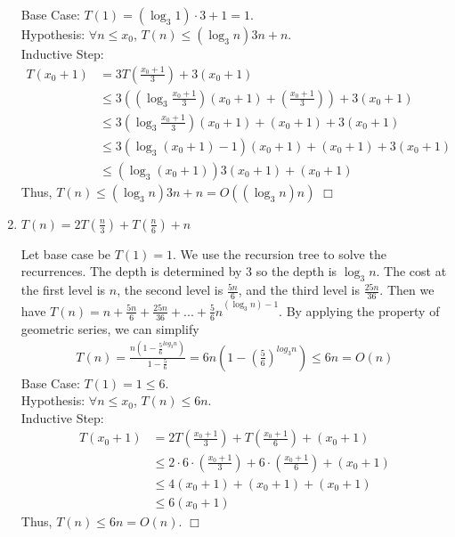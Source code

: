 \documentclass[10pt]{article}
\newenvironment{proof}{\par\noindent{\it Proof.}\hspace*{1em}}{$\Box$\bigskip}
\begin{document}
\begin{enumerate}
\begin{proof}
    Base Case: $T(1)= (\log_3 1)\cdot 3 + 1 = 1$.\\
    Hypothesis: $\forall n \leq x_0$, $T(n) \leq (\log_3 n)3n + n$.\\
    Inductive Step: 
    \begin{align}
        T(x_0+1)&=3T(\frac{x_0+1}{3})+3(x_0+1)\\
                &\leq 3((\log_3 {\frac{x_0+1}{3}})(x_0+1) + {(\frac{x_0+1}{3})})+3(x_0+1)\\
                &\leq 3(\log_3 {\frac{x_0+1}{3}})(x_0+1) + (x_0+1)+3(x_0+1)\\
                &\leq 3(\log_3 (x_0+1)-1)(x_0+1) +(x_0+1)+3(x_0+1)\\
                &\leq (\log_3 (x_0+1))3(x_0+1) + (x_0+1) 
    \end{align}
    Thus, $T(n) \leq (\log_3 n)3n+n = O((\log_3 n)n)$
    \end{proof}
    \item $T(n) = 2 T(\frac{n}{3}) + T(\frac{n}{6}) + n$
    \begin{proof}
    Let base case be $T(1)=1$. We use the recursion tree to solve the recurrences. The depth is determined by 3 so the depth is $\log_3 n$. The cost at the first level is $n$, the second level is $\frac{5n}{6}$, and the third level is $\frac{25n}{36}$. Then we have $T(n) = n + \frac{5n}{6} + \frac{25n}{36} + ... + {\frac{5}{6}n}^{(\log_3 n)-1}$. By applying the property of geometric series, we can simplify 
    \begin{align}
        T(n) = \frac{n(1-{\frac{5}{6}}^{log_3 n})}{1-\frac{5}{6}}=6n(1-(\frac{5}{6})^{log_3 n}) \leq 6n = O(n)
    \end{align}
    Base Case: $T(1)= 1 \leq 6$.\\
    Hypothesis: $\forall n \leq x_0$, $T(n) \leq 6n$.\\
    Inductive Step:
    \begin{align}
        T(x_0+1)&=2T(\frac{x_0+1}{3})+T(\frac{x_0+1}{6})+(x_0+1)\\
                &\leq 2 \cdot 6 \cdot (\frac{x_0+1}{3}) + 6 \cdot (\frac{x_0+1}{6})  + (x_0+1)\\
                & \leq 4(x_0+1) + (x_0+1) + (x_0+1)\\
                & \leq 6(x_0+1)
    \end{align}
    Thus, $T(n) \leq 6n = O(n)$.
    \end{proof}

\end{enumerate}
\end{document}
